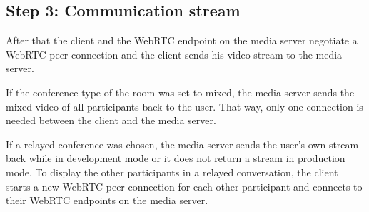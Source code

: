 \documentclass[../../../thesis.tex]{subfiles}
\begin{document}
\subsection{Step 3: Communication stream}
After that the client and the WebRTC endpoint on the media server negotiate a WebRTC peer connection and the client sends his video stream to the media server.\par
If the conference type of the room was set to mixed, the media server sends the mixed video of all participants back to the user. That way, only one connection is needed between the client and the media server.\par
If a relayed conference was chosen, the media server sends the user's own stream back while in development mode or it does not return a stream in production mode. To display the other participants in a relayed conversation, the client starts a new WebRTC peer connection for each other participant and connects to their WebRTC endpoints on the media server.


\end{document}
